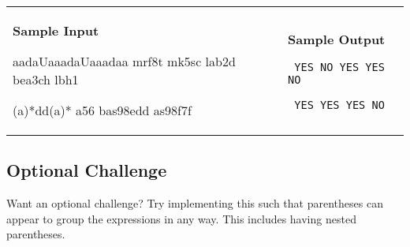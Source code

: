 \documentclass[11pt]{article}
\begin{document}
\vspace{0.25in}\hspace{-0.3in}\begin{tabular}{ll}

\parbox{3in}{{\large\bf Sample Input}

\vspace{0.15in}

{\tt 

aadaUaaadaUaaadaa  \linebreak
mrf8t \linebreak
mk5sc \linebreak
lab2d \linebreak
bea3ch \linebreak
lbh1

}

\vspace{0.15in}

{\tt

(a)*dd(a)*   \linebreak
a56 \linebreak
bas98edd \linebreak
as98f7f

}
}

&

\parbox{3in}{{\large\bf Sample Output}

\vspace{0.15in}

{\tt
YES \linebreak
NO \linebreak
YES \linebreak
YES \linebreak
NO
}

\vspace{0.15in}

{\tt
YES \linebreak
YES \linebreak
YES \linebreak
NO
}
}

\\
\end{tabular}

\subsection*{Optional Challenge}

Want an optional challenge? Try implementing this such that parentheses can appear to group the expressions in any way. This includes having nested parentheses.
\end{document}
